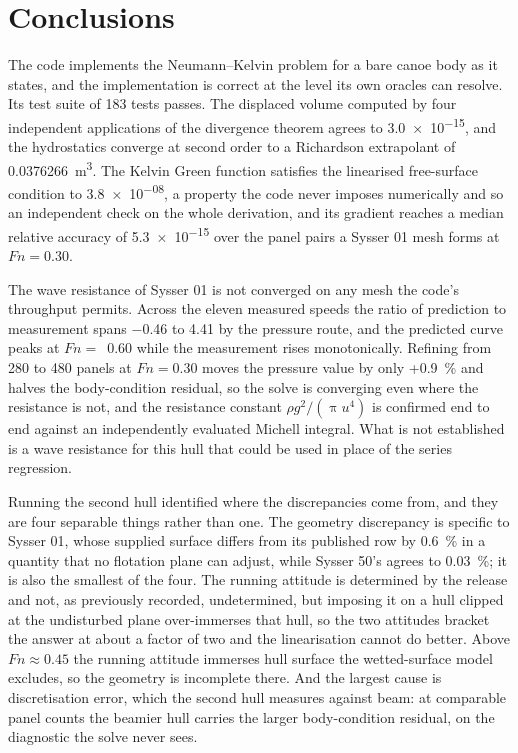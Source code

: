 \documentclass[11pt]{article}
\newcommand{\Fn}{\mathit{Fn}}
\begin{document}
\section{Conclusions}
The code implements the Neumann--Kelvin problem for a bare canoe body as it states, and the
implementation is correct at the level its own oracles can resolve. Its test suite of 183 tests passes. The displaced volume computed by four independent applications of the
divergence theorem agrees to \num{3.0e-15}, and the hydrostatics converge at second order to a
Richardson extrapolant of \SI{0.0376266}{\metre\cubed}. The Kelvin Green function satisfies
the linearised free-surface condition to \num{3.8e-08}, a property the code never imposes
numerically and so an independent check on the whole derivation, and its gradient reaches a
median relative accuracy of \num{5.3e-15} over the panel pairs a Sysser 01 mesh forms at
$\Fn = 0.30$.

The wave resistance of Sysser 01 is not converged on any mesh the code's throughput permits.
Across the eleven measured speeds the ratio of
prediction to measurement spans \num{-0.46} to \num{+4.41} by the pressure route, and the predicted
curve peaks at $\Fn = $~0.60 while the measurement rises monotonically. Refining from 280
to 480 panels at $\Fn = 0.30$ moves the pressure value by only +0.9~\si{\percent} and
halves the body-condition residual, so the solve is converging even where the resistance is
not, and the resistance constant $\rho g^2/(\uppi u^4)$ is confirmed end to end against an
independently evaluated Michell integral. What is not established is a wave resistance for
this hull that could be used in place of the series regression.

Running the second hull identified where the discrepancies come from, and they are four
separable things rather than one. The geometry discrepancy is specific to Sysser 01, whose
supplied surface differs from its published row by \SI{0.6}{\percent} in a quantity that no
flotation plane can adjust, while Sysser 50's agrees to \SI{0.03}{\percent}; it is also the
smallest of the four. The running attitude is determined by the release and not, as
previously recorded, undetermined, but imposing it on a hull clipped at the undisturbed plane
over-immerses that hull, so the two attitudes bracket the answer at about a factor of two and
the linearisation cannot do better. Above $\Fn \approx 0.45$ the running attitude immerses
hull surface the wetted-surface model excludes, so the geometry is incomplete there. And the
largest cause is discretisation error, which the second hull measures against beam: at
comparable panel counts the beamier hull carries the larger body-condition residual, on the
diagnostic the solve never sees.
\end{document}
